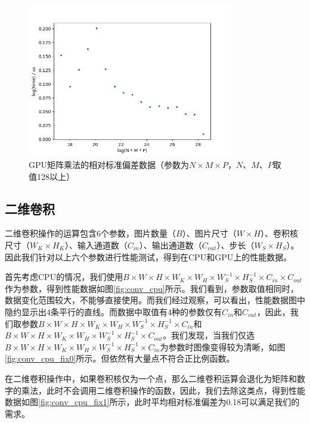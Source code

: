     \begin{figure}[!htbp]
        \centering
        \includegraphics[width=0.8\textwidth]{figures/matmul_gpu_nmp_rsd_big.png}
        \caption{GPU矩阵乘法的相对标准偏差数据（参数为$ N \times M \times P $，$ N $、$ M $、$ P $取值128以上）}
        \label{fig:matmul_gpu_nmp_rsd_big}
    \end{figure}

\subsection{二维卷积}
    二维卷积操作的运算包含6个参数，图片数量（$ B $）、图片尺寸（$ W \times H $）、卷积核尺寸（$ W_K \times H_K $）、输入通道数（$ C_{in} $）、输出通道数（$ C_{out} $）、步长（$ W_S \times H_S $）。因此我们针对以上六个参数进行性能测试，得到在CPU和GPU上的性能数据。

    首先考虑CPU的情况，我们使用$ B \times W \times H \times W_K \times W_H \times W_S^{-1} \times H_S^{-1} \times C_{in} \times C_{out} $作为参数，得到性能数据如图\ref{fig:conv_cpu}所示。我们看到，参数取值相同时，数据变化范围较大，不能够直接使用。而我们经过观察，可以看出，性能数据图中隐约显示出4条平行的直线。而数据中取值有4种的参数仅有$ C_{in} $和$ C_{out} $，因此，我们取参数$ B \times W \times H \times W_K \times W_H \times W_S^{-1} \times H_S^{-1} \times C_{in} $和$ B \times W \times H \times W_K \times W_H \times W_S^{-1} \times H_S^{-1} \times C_{out} $。我们发现，当我们仅选$ B \times W \times H \times W_K \times W_H \times W_S^{-1} \times H_S^{-1} \times C_{in}  $为参数时图像变得较为清晰，如图\ref{fig:conv_cpu_fix0}所示。但依然有大量点不符合正比例函数。
    
    在二维卷积操作中，如果卷积核仅为一个点，那么二维卷积运算会退化为矩阵和数字的乘法，此时不会调用二维卷积操作的函数，因此，我们去除这类点，得到性能数据如图\ref{fig:conv_cpu_fix1}所示，此时平均相对标准偏差为0.18可以满足我们的需求。

